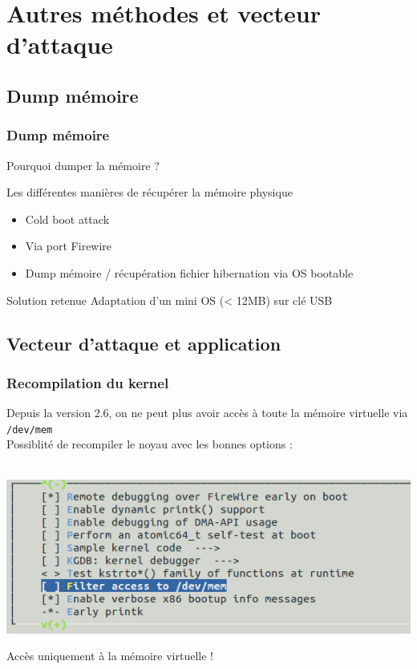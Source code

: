 \documentclass[red]{beamer}
\begin{document}
\section{Autres méthodes et vecteur d'attaque}
\subsection{Dump mémoire}
\begin{frame}
    \frametitle{Dump mémoire}
    \begin{center}
    {\LARGE Pourquoi dumper la mémoire ?} ~~\\
    \end{center}
    Les différentes manières de récupérer la mémoire physique
    \begin{itemize}
        \item Cold boot attack
        \item Via port Firewire
        \item Dump mémoire / récupération fichier hibernation  via OS bootable 
    \end{itemize}
    \begin{block}{Solution retenue}
    Adaptation d'un mini OS (< 12MB) sur clé USB 
    \end{block}
\end{frame}

\subsection{Vecteur d'attaque et application}
\begin{frame}
    \frametitle{Recompilation du kernel}
    Depuis la version 2.6, on ne peut plus avoir accès à toute la mémoire virtuelle via \texttt{/dev/mem} \\
    Possiblité de recompiler le noyau avec les bonnes options :

    ~~ \\
    \centering
        \includegraphics[height=0.40\textheight]{img/kernel.png}

    Accès uniquement à la mémoire virtuelle !
\end{frame}
\end{document}
